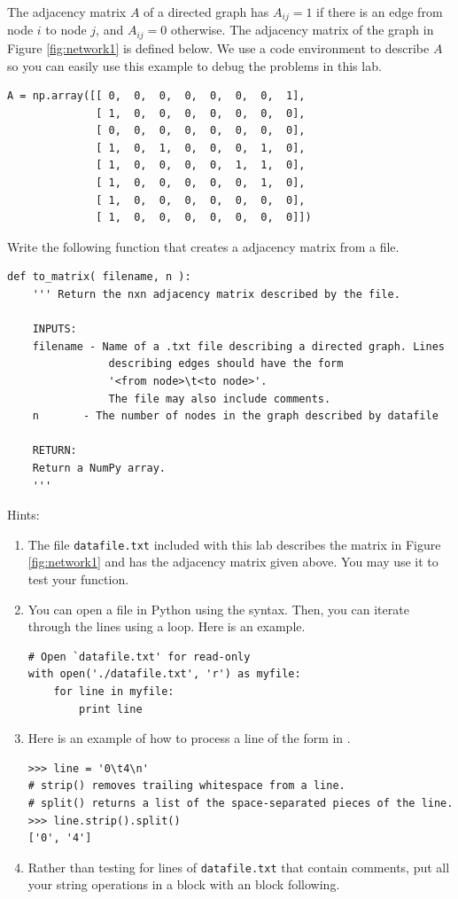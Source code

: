 The adjacency matrix $A$ of a directed graph has $A_{ij}=1$ if there is an edge from node $i$ to node $j$, and $A_{ij}=0$ otherwise.
The adjacency matrix of the graph in Figure \ref{fig:network1} is defined below.
We use a code environment to describe $A$ so you can easily use this example to debug the problems in this lab.
\begin{lstlisting}
A = np.array([[ 0,  0,  0,  0,  0,  0,  0,  1],
              [ 1,  0,  0,  0,  0,  0,  0,  0],
              [ 0,  0,  0,  0,  0,  0,  0,  0],
              [ 1,  0,  1,  0,  0,  0,  1,  0],
              [ 1,  0,  0,  0,  0,  1,  1,  0],
              [ 1,  0,  0,  0,  0,  0,  1,  0],
              [ 1,  0,  0,  0,  0,  0,  0,  0],
              [ 1,  0,  0,  0,  0,  0,  0,  0]])
\end{lstlisting}

\begin{problem}
Write the following function that creates a adjacency matrix from a file.
\begin{lstlisting}
def to_matrix( filename, n ):
    ''' Return the nxn adjacency matrix described by the file.

    INPUTS:
    filename - Name of a .txt file describing a directed graph. Lines
    		    describing edges should have the form
				'<from node>\t<to node>'.
				The file may also include comments.
    n		- The number of nodes in the graph described by datafile

    RETURN:
    Return a NumPy array.
    '''
\end{lstlisting}
Hints:
\begin{enumerate}
\item The file \texttt{datafile.txt} included with this lab describes the matrix in Figure \ref{fig:network1} and has the adjacency matrix  given above.
You may use it to test your function.

\item You can open a file in Python using the  syntax.
Then, you can iterate through the lines using a  loop.
Here is an example.
\begin{lstlisting}
# Open `datafile.txt' for read-only
with open('./datafile.txt', 'r') as myfile:
    for line in myfile:
        print line
\end{lstlisting}

\item Here is an example of how to process a line of the form in .
\begin{lstlisting}
>>> line = '0\t4\n'
# strip() removes trailing whitespace from a line.
# split() returns a list of the space-separated pieces of the line.
>>> line.strip().split()
['0', '4']
\end{lstlisting}

\item Rather than testing for lines of \texttt{datafile.txt} that contain comments, put all your string operations in a  block with an  block following.
\end{enumerate}
\end{problem}

